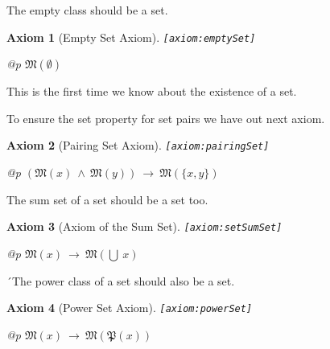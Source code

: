 \documentclass[a4paper,german,10pt,twoside]{book}
\newtheorem{ax}{Axiom}
\theoremstyle{definition}
\theoremstyle{remark}
\begin{document}
\par
The empty class should be a set.

\begin{ax}[Empty Set Axiom]
\label{axiom:emptySet} \hypertarget{axiom:emptySet}{}
{\tt \tiny [\verb]axiom:emptySet]]}
\mbox{}
\begin{longtable}{{@{\extracolsep{\fill}}p{\linewidth}}}
\centering $\mathfrak{M}(\emptyset)$
\end{longtable}

\end{ax}

This is the first time we know about the existence of a set.


\par
To ensure the set property for set pairs we have out next axiom.

\begin{ax}[Pairing Set Axiom]
\label{axiom:pairingSet} \hypertarget{axiom:pairingSet}{}
{\tt \tiny [\verb]axiom:pairingSet]]}
\mbox{}
\begin{longtable}{{@{\extracolsep{\fill}}p{\linewidth}}}
\centering $(\mathfrak{M}(x)\ \land\ \mathfrak{M}(y))\ \rightarrow\ \mathfrak{M}(\{ x, y \})$
\end{longtable}

\end{ax}


\par
The sum set of a set should be a set too.

\begin{ax}[Axiom of the Sum Set]
\label{axiom:setSumSet} \hypertarget{axiom:setSumSet}{}
{\tt \tiny [\verb]axiom:setSumSet]]}
\mbox{}
\begin{longtable}{{@{\extracolsep{\fill}}p{\linewidth}}}
\centering $\mathfrak{M}(x)\ \rightarrow\ \mathfrak{M}(\bigcup \ x)$
\end{longtable}

\end{ax}


\par
´The power class of a set should also be a set.

\begin{ax}[Power Set Axiom]
\label{axiom:powerSet} \hypertarget{axiom:powerSet}{}
{\tt \tiny [\verb]axiom:powerSet]]}
\mbox{}
\begin{longtable}{{@{\extracolsep{\fill}}p{\linewidth}}}
\centering $\mathfrak{M}(x)\ \rightarrow\ \mathfrak{M}(\mathfrak{P}(x))$
\end{longtable}

\end{ax}
\end{document}
